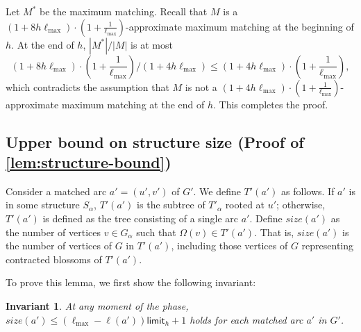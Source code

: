 \documentclass{article}
\newcommand{\alp}{\alpha}
\newcommand{\Omg}{\Omega}
\newcommand{\lmax}{\ell_{\max}}
\newcommand{\limit}{\mathsf{limit}}
\newtheorem{invariant}[theorem]{Invariant}
\newcommand{\rb}[1]{\left( #1 \right)}
\begin{document}
    Let $M^*$ be the maximum matching.
    Recall that $M$ is a $(1 + 8h\lmax)\cdot \rb{1 + \frac{1}{\lmax}}$-approximate maximum matching at the beginning of $h$.
    At the end of $h$, $|M^*| / |M|$ is at most
    \[
        (1 + 8h\lmax)\cdot \rb{1 + \frac{1}{\lmax}} / \rb{1 + 4h\lmax} \leq \rb{1 + 4h\lmax}\cdot \rb{1 + \frac{1}{\lmax}},
    \]
    which contradicts the assumption that $M$ is not a $\rb{1 + 4h\lmax}\cdot \rb{1 + \frac{1}{\lmax}}$-approximate maximum matching at the end of $h$.
    This completes the proof.


\subsection{Upper bound on structure size (Proof of \cref{lem:structure-bound})}
\label{sec:proof-structure-bound}
Consider a matched arc $a' = (u', v')$ of $G'$. We define $T'(a')$ as follows.
If $a'$ is in some structure $S_\alp$, $T'(a')$ is the subtree of $T'_\alp$ rooted at $u'$;
otherwise, $T'(a')$ is defined as the tree consisting of a single arc $a'$.
Define $size(a')$ as the number of vertices $v \in G_\alp$ such that $\Omg(v) \in T'(a')$. That is, $size(a')$ is the number of vertices of $G$ in $T'(a')$, including those vertices of $G$ representing contracted blossoms of $T'(a')$.

To prove this lemma, we first show the following invariant:
\begin{invariant}
    At any moment of the phase, $size(a') \leq (\lmax - \ell(a'))\limit_h + 1$ holds for each matched arc $a'$ in $G'$.    
\end{invariant}
\end{document}
